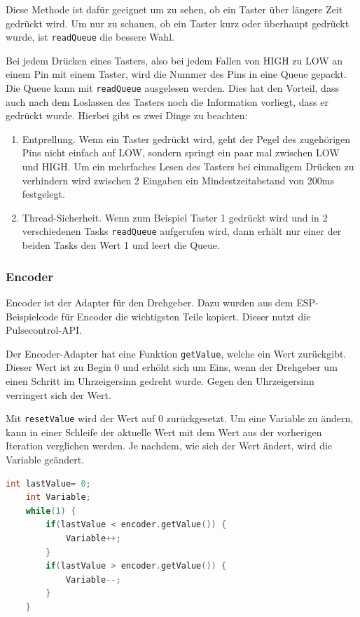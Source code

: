 Diese Methode ist dafür geeignet um zu sehen, ob ein Taster über längere
Zeit gedrückt wird. Um nur zu schauen, ob ein Taster kurz oder überhaupt
gedrückt wurde, ist \lstinline|readQueue| die bessere Wahl.

Bei jedem Drücken eines Tasters, also bei jedem Fallen von HIGH 
zu LOW an einem Pin mit einem Taster, wird die Nummer des Pins 
in eine Queue gepackt.
Die Queue kann mit \lstinline|readQueue| ausgelesen werden. Dies hat den 
Vorteil, dass auch nach dem Loslassen des Tasters noch die Information vorliegt, 
dass er gedrückt wurde.
Hierbei gibt es zwei Dinge zu beachten:

\begin{enumerate}
\item Entprellung. Wenn ein Taster gedrückt wird, geht der Pegel des 
zugehörigen Pins nicht einfach auf LOW, sondern springt ein paar mal 
zwischen LOW und HIGH. Um ein mehrfaches Lesen des Tasters bei
einmaligem Drücken zu verhindern wird zwischen 2 Eingaben 
ein Mindestzeitabstand von 200ms festgelegt.

\item Thread-Sicherheit. Wenn zum Beispiel Taster 1 gedrückt wird und in 
2 verschiedenen Tasks 
\lstinline|readQueue| aufgerufen wird, dann erhält nur einer der beiden Tasks
den Wert 1 und leert die Queue.
\end{enumerate}

\subsubsection{Encoder}
Encoder ist der Adapter für den Drehgeber. Dazu wurden aus dem 
ESP-Beispielcode \cite{espEncoder} für Encoder die wichtigsten Teile kopiert.
Dieser nutzt die Pulsecontrol-API. 

Der Encoder-Adapter hat eine Funktion \lstinline|getValue|, welche ein Wert 
zurückgibt. Dieser Wert ist zu Begin 0 und erhöht sich um Eins, wenn der 
Drehgeber um einen Schritt im Uhrzeigersinn gedreht wurde. 
Gegen den Uhrzeigersinn verringert sich der Wert.

Mit \lstinline|resetValue| wird der Wert auf 0 zurückgesetzt.
Um eine Variable zu ändern, kann in einer Schleife der aktuelle Wert mit
dem Wert aus der vorherigen Iteration verglichen werden.
Je nachdem, wie sich der Wert ändert, wird die Variable geändert.

\begin{lstlisting}[language=C++, 
                   frame=single, 
                   caption={Beispiel Variable ändern mit Encoder},
                   captionpos=b]
    int lastValue= 0;
    int Variable;
    while(1) {
        if(lastValue < encoder.getValue()) { 
            Variable++;
        }
        if(lastValue > encoder.getValue()) {
            Variable--;
        }
    }
\end{lstlisting}

